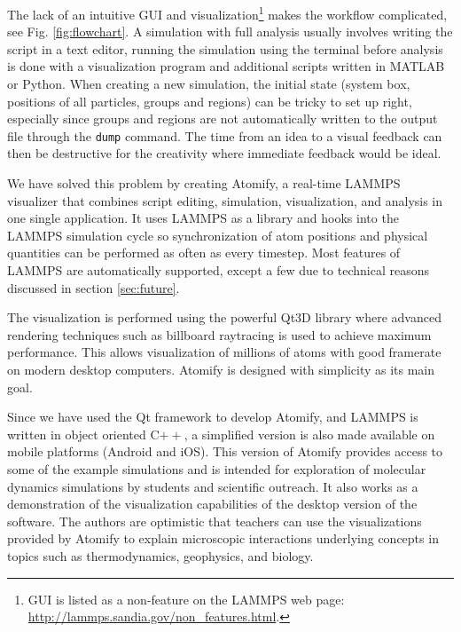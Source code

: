 \documentclass[aps,pre,twocolumn,letterpaper,floatfix,nofootinbib]{revtex4}
\newcommand*{\cpp}{C\ensuremath{++}\xspace}
\newcommand{\code}[1]{\colorbox{light-gray}{\color{RawSienna}\texttt{#1}}}
\begin{document}
The lack of an intuitive GUI and visualization\footnote{GUI is listed as a non-feature on the LAMMPS web page: \url{http://lammps.sandia.gov/non_features.html}.}
makes the workflow complicated, see Fig. \ref{fig:flowchart}.
A simulation with full analysis usually involves writing the script in a text editor, running the simulation using the terminal before analysis is done with a visualization program and additional scripts written in MATLAB or Python.
When creating a new simulation, the initial state (system box, positions of all particles, groups and regions) can be tricky to set up right, especially since groups and regions are not automatically written to the output file through the \code{dump} command.
The time from an idea to a visual feedback can then be destructive for the creativity where immediate feedback would be ideal.

We have solved this problem by creating Atomify, a real-time LAMMPS visualizer that combines script editing, simulation, visualization, and analysis in one single application.
It uses LAMMPS as a library and hooks into the LAMMPS simulation cycle so synchronization of atom positions and physical quantities can be performed as often as every timestep.
Most features of LAMMPS are automatically supported, except a few due to technical reasons discussed in section \ref{sec:future}.

The visualization is performed using the powerful Qt3D library where advanced rendering techniques such as billboard raytracing is used to achieve maximum performance.
This allows visualization of millions of atoms with good framerate on modern desktop computers.
Atomify is designed with simplicity as its main goal.

Since we have used the Qt framework to develop Atomify, and LAMMPS is written in object oriented \cpp, a simplified version is also made available on mobile platforms (Android and iOS).
This version of Atomify provides access to some of the example simulations and is intended for exploration of molecular dynamics simulations by students and scientific outreach.
It also works as a demonstration of the visualization capabilities of the desktop version of the software.
The authors are optimistic that teachers can use the visualizations provided by
Atomify to explain microscopic interactions underlying concepts in topics such
as thermodynamics, geophysics, and biology.
\end{document}
